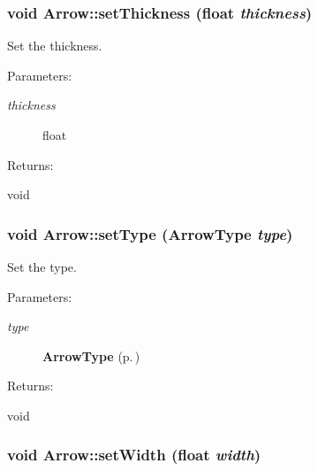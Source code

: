 \subsubsection{\setlength{\rightskip}{0pt plus 5cm}void Arrow::set\-Thickness (float {\em thickness})\hspace{0.3cm}{\tt  [inline]}}\label{classArrow_a4}


Set the thickness. \begin{Desc}
\item[Parameters: ]\par
\begin{description}
\item[{\em 
thickness}]float \end{description}
\end{Desc}
\begin{Desc}
\item[Returns: ]\par
void \end{Desc}
\subsubsection{\setlength{\rightskip}{0pt plus 5cm}void Arrow::set\-Type ({\bf Arrow\-Type} {\em type})\hspace{0.3cm}{\tt  [inline]}}\label{classArrow_a2}


Set the type. \begin{Desc}
\item[Parameters: ]\par
\begin{description}
\item[{\em 
type}]{\bf Arrow\-Type} {\rm (p.\,\pageref{classArrow_s6})} \end{description}
\end{Desc}
\begin{Desc}
\item[Returns: ]\par
void \end{Desc}
\subsubsection{\setlength{\rightskip}{0pt plus 5cm}void Arrow::set\-Width (float {\em width})\hspace{0.3cm}{\tt  [inline]}}\label{classArrow_a5}


